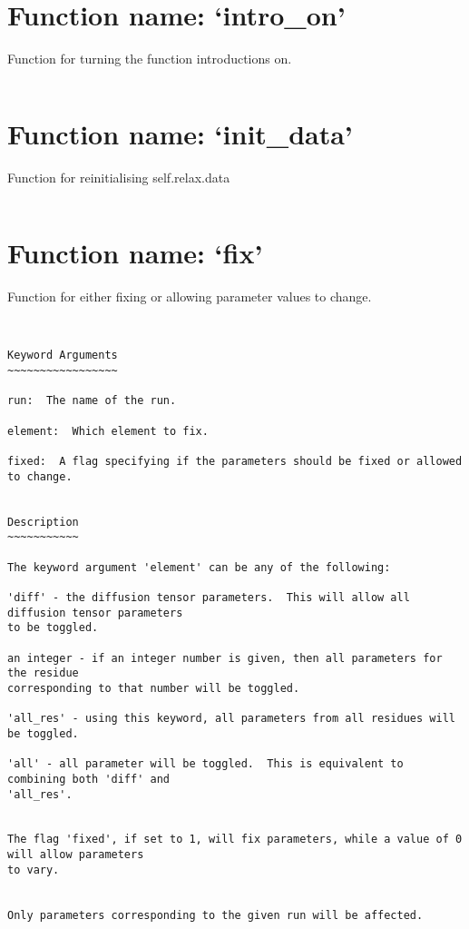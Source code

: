 \section{Function name: `intro\_on'}

Function for turning the function introductions on.
\scriptsize
\begin{verbatim}

\end{verbatim}

\normalsize
\section{Function name: `init\_data'}

Function for reinitialising self.relax.data
\scriptsize
\begin{verbatim}

\end{verbatim}

\normalsize
\section{Function name: `fix'}

Function for either fixing or allowing parameter values to change.
\scriptsize
\begin{verbatim}


Keyword Arguments
~~~~~~~~~~~~~~~~~

run:  The name of the run.

element:  Which element to fix.

fixed:  A flag specifying if the parameters should be fixed or allowed to change.


Description
~~~~~~~~~~~

The keyword argument 'element' can be any of the following:

'diff' - the diffusion tensor parameters.  This will allow all diffusion tensor parameters
to be toggled.

an integer - if an integer number is given, then all parameters for the residue
corresponding to that number will be toggled.

'all_res' - using this keyword, all parameters from all residues will be toggled.

'all' - all parameter will be toggled.  This is equivalent to combining both 'diff' and
'all_res'.


The flag 'fixed', if set to 1, will fix parameters, while a value of 0 will allow parameters
to vary.


Only parameters corresponding to the given run will be affected.

\end{verbatim}

